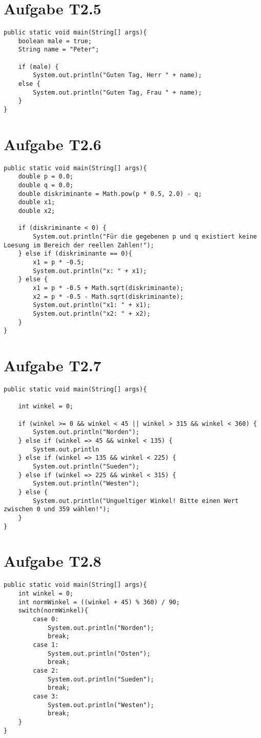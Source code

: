 \documentclass[final,a4paper]{article}
\begin{document}
\section*{Aufgabe T2.5}
\begin{lstlisting}
public static void main(String[] args){
	boolean male = true;
	String name = "Peter";
	
	if (male) {
		System.out.println("Guten Tag, Herr " + name);
	else {
		System.out.println("Guten Tag, Frau " + name);
	}
}
\end{lstlisting}

\section*{Aufgabe T2.6}
\begin{lstlisting}
public static void main(String[] args){
	double p = 0.0;
	double q = 0.0;
	double diskriminante = Math.pow(p * 0.5, 2.0) - q;
	double x1;
	double x2;

	if (diskriminante < 0) {
		System.out.println("Für die gegebenen p und q existiert keine Loesung im Bereich der reellen Zahlen!");
	} else if (diskriminante == 0){
		x1 = p * -0.5;
		System.out.println("x: " + x1);
	} else {
		x1 = p * -0.5 + Math.sqrt(diskriminante);
		x2 = p * -0.5 - Math.sqrt(diskriminante);
		System.out.println("x1: " + x1);
		System.out.println("x2: " + x2);
	}
}
\end{lstlisting}

\clearpage

\section*{Aufgabe T2.7}
\begin{lstlisting}
public static void main(String[] args){

	int winkel = 0;

	if (winkel >= 0 && winkel < 45 || winkel > 315 && winkel < 360) {
		System.out.println("Norden");
	} else if (winkel => 45 && winkel < 135) {
		System.out.println
	} else if (winkel => 135 && winkel < 225) {
		System.out.println("Sueden");
	} else if (winkel => 225 && winkel < 315) {
		System.out.println("Westen");
	} else {
		System.out.println("Ungueltiger Winkel! Bitte einen Wert zwischen 0 und 359 wählen!");
	}
}
\end{lstlisting}

\section*{Aufgabe T2.8}
\begin{lstlisting}
public static void main(String[] args){
	int winkel = 0;
	int normWinkel = ((winkel + 45) % 360) / 90;
	switch(normWinkel){
		case 0:
			System.out.println("Norden");
			break;
		case 1:
			System.out.println("Osten");
			break;
		case 2:
			System.out.println("Sueden");
			break;
		case 3:
			System.out.println("Westen");
			break;
	}
}
\end{lstlisting}
\end{document}
